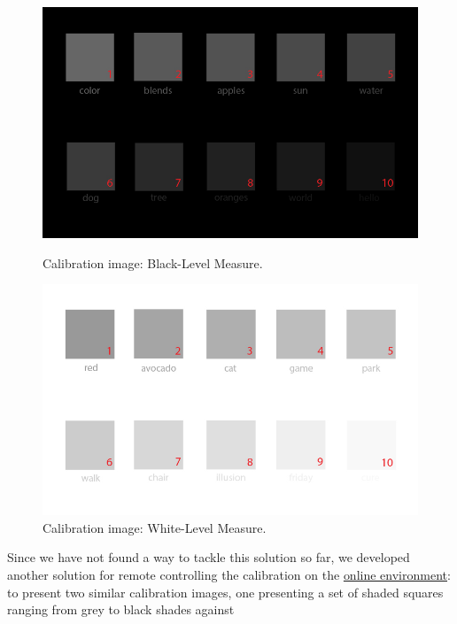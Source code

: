 \begin{figure}[htbp]
  \centering
  \begin{minipage}{0.4\textwidth}
		\centering
	  \includegraphics[width=\textwidth]{images/implementation/calibration_blackLevel.jpg}
	  \caption[Calibration image: Black-Level Measure.]{Calibration image: Black-Level Measure.}
	  \label{fig:black_level}
  \end{minipage}\hfill
  \begin{minipage}{0.4\textwidth}
		\centering
	  \includegraphics[width=\textwidth]{images/implementation/calibration_whiteLevel.jpg}
	  \caption[Calibration image: White-Level Measure.]{Calibration image: White-Level Measure.}
	  \label{fig:white_level}
  \end{minipage}
\end{figure}
%
Since we have not found a way to tackle this solution so far, we developed another solution for remote controlling the calibration on the
\ul{online environment}: to present two similar calibration images, one presenting a set of shaded squares ranging from grey to black shades against
